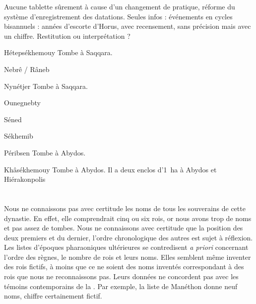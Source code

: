 \noi{}

Aucune tablette \donc{} sûrement à cause d'un changement de pratique, 
réforme du système d'enregistrement des datations. Seules infos : 
\donc{} événements en cycles bisannuels : années d'escorte d'Horus, avec 
recensement, sans précision mais avec un chiffre. Restitution ou 
interprétation ?

\begin{listerois}
  \item [Hétepsékhemouy] Tombe à Saqqara.
  \item [Nebrê / Râneb]
  \item [Nynétjer] Tombe à Saqqara.
  \item [Ounegnebty]
  \item [Séned]
  \item [Sékhemib]
  \item [Péribsen] Tombe à Abydos.
  \item [Khâsékhemouy] Tombe à Abydos. Il a deux enclos 
        d'\SI{1}{\hectare} à Abydos et Hiérakonpolis
\end{listerois}

\section{\OK}


\subsection{\texorpdfstring{}{IIIe dynastie}}

Nous ne connaissons pas avec certitude les noms de tous les souverains 
de cette dynastie. En effet, elle comprendrait cinq ou six rois, or 
nous avons trop de noms et pas assez de tombes. Nous ne connaissons 
avec certitude que la position des deux premiers et du dernier, 
l'ordre chronologique des autres est sujet à réflexion. Les listes 
d'époques pharaoniques ultérieures se contredisent \emph{a priori} 
concernant l'ordre des règnes, le nombre de rois et leurs noms. Elles 
semblent même inventer des rois fictifs, à moins que ce ne soient des 
noms inventés correspondant à des rois que nous ne reconnaissons pas. 
Leurs données ne concordent pas avec les témoins contemporains de la 
. Par exemple, la liste de Manéthon donne neuf noms, chiffre 
certainement fictif.

